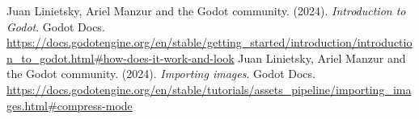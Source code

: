 
\begin{thebibliography}{99}
     Juan Linietsky, Ariel Manzur and the Godot community. (2024). \textit{Introduction to Godot}. Godot Docs. \url{https://docs.godotengine.org/en/stable/getting\_started/introduction/introduction\_to\_godot.html#how-does-it-work-and-look}
     Juan Linietsky, Ariel Manzur and the Godot community. (2024). \textit{Importing images}. Godot Docs. \url{https://docs.godotengine.org/en/stable/tutorials/assets\_pipeline/importing\_images.html#compress-mode}
\end{thebibliography}
